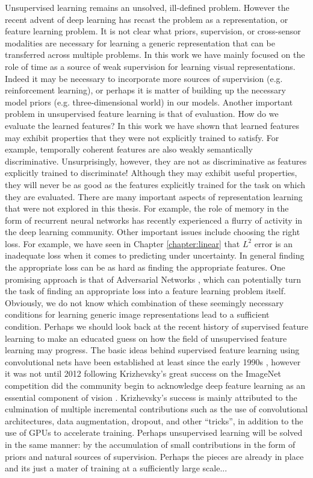 Unsupervised learning remains an unsolved, ill-defined problem. However the
recent advent of deep learning has recast the problem as a representation, or
feature learning problem. It is not clear what priors, supervision, or
cross-sensor modalities are necessary for learning a generic representation
that can be transferred across multiple problems.  In this work we have mainly
focused on the role of time as a source of weak supervision for learning visual
representations. Indeed it may be necessary to incorporate more sources of
supervision (e.g. reinforcement learning), or perhaps it is matter of building
up the necessary model priors (e.g. three-dimensional world) in our models.
Another important problem in unsupervised feature learning is that of
evaluation. How do we evaluate the learned features?  In this work we have
shown that learned features may exhibit properties that they were not
explicitly trained to satisfy. For example, temporally coherent features are
also weakly semantically discriminative. Unsurprisingly, however, they are not
as discriminative as features explicitly trained to discriminate! Although they
may exhibit useful properties, they will never be as good as the features
explicitly trained for the task on which they are evaluated. There are many
important aspects of representation learning that were not explored in this
thesis. For example, the role of memory in the form of recurrent neural
networks has recently experienced a flurry of activity in the deep learning
community. Other important issues include choosing the right loss. For example,
we have seen in Chapter \ref{chapter:linear} that $L^2$ error is an inadequate
loss when it comes to predicting under uncertainty. In general finding the
appropriate loss can be as hard as finding the appropriate features. One
promising approach is that of Adversarial Networks \cite{goodfellow2014}, which
can potentially turn the task of finding an appropriate loss into a feature
learning problem itself. Obviously, we do not know which combination of these
seemingly necessary conditions for learning generic image representations lead
to a sufficient condition. Perhaps we should look back at the recent history of
supervised feature learning to make an educated guess on how the field of
unsupervised feature learning may progress. The basic ideas behind supervised
feature learning using convolutional nets  have been established at least since
the early 1990s \cite{lecun1995}, however it was not until 2012 following
Krizhevsky's great success on the ImageNet competition did the community begin
to acknowledge deep feature learning as an essential component of vision
\cite{ImageNet}.  Krizhevsky's success is mainly attributed to the culmination
of multiple incremental contributions such as the use of convolutional
architectures, data augmentation, dropout, and other ``tricks'', in addition to
the use of GPUs to accelerate training. Perhaps unsupervised learning will be
solved in the same manner: by the accumulation of small contributions in the
form of priors and natural sources of supervision.  Perhaps the pieces are
already in place and its just a mater of training at a sufficiently large
scale...      
   
